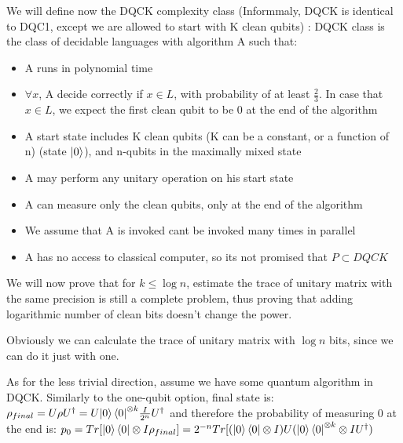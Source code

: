 \documentclass{article}
\begin{document}
We will define now the DQCK complexity class (Informmaly, DQCK is identical to DQC1, except we are allowed to start with K clean qubits) :
DQCK class is the class of decidable languages with algorithm A such that:
\begin{itemize}
\item A runs in polynomial time
\item $\forall x$, A decide correctly if $x \in L$, with probability of at least $\frac{2}{3}$. 
In case that $x \in L$, we expect the first clean qubit to be 0 at the end of the algorithm
\item A start state includes K clean qubits (K can be a constant, or a function of n) (state $\left\vert{0}\right\rangle$), and n-qubits in the maximally mixed state
\item A may perform any unitary operation on his start state
\item A can measure only the clean qubits, only at the end of the algorithm
\item We assume that A is invoked cant be invoked many times in parallel
\item A has no access to classical computer, so its not promised that $P \subset DQCK$ 
\end{itemize}  

We will now prove that for $k \leq \log{n}$, estimate the trace of unitary matrix with the same precision is still a complete problem, thus proving that adding logarithmic number of clean bits doesn't change the power. 

Obviously we can calculate the trace of unitary matrix with $\log{n}$ bits, since we can do it just with one. 


As for the less trivial direction, assume we have some quantum algorithm in DQCK.
Similarly to the one-qubit option, final state is:
$\rho_{final} = U\rho{U^\dagger} = U{\left\vert{0}\right\rangle\left\langle{0}\right\vert}^{\otimes k}\frac{I}{2^n}{U^\dagger}$
and therefore the probability of measuring 0 at the end is:
$p_{0} = Tr[{\Ket{0}\Bra{0}} \otimes I\rho_{final}] = 2^{-n}Tr[(\Ket{0}\Bra{0}\otimes I)U({\Ket{0}\Bra{0}}^{\otimes k}\otimes I{U^\dagger})$
\end{document}
